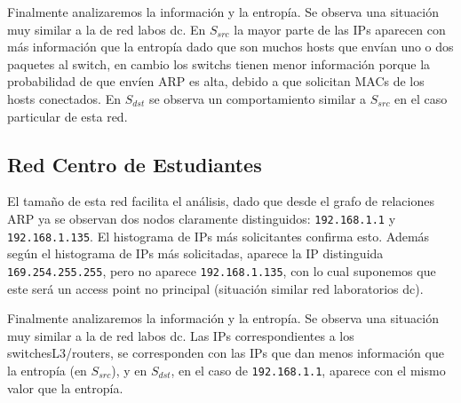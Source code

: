 Finalmente analizaremos la información y la entropía. Se observa una situación muy similar a la de red labos dc. En $S_{src}$ la mayor parte de las IPs
aparecen con más información que la entropía dado que son muchos hosts que envían uno o dos paquetes al switch, en cambio los switchs tienen menor
información porque la probabilidad de que envíen ARP es alta, debido a que solicitan MACs de los hosts conectados. En $S_{dst}$ se observa un
comportamiento similar a $S_{src}$ en el caso particular de esta red.


\subsection{Red Centro de Estudiantes}

El tamaño de esta red facilita el análisis, dado que desde el grafo de relaciones ARP ya se observan dos nodos claramente distinguidos:
{\tt 192.168.1.1} y {\tt 192.168.1.135}. El histograma de IPs más solicitantes confirma esto. 
Además según el histograma de IPs más solicitadas, aparece la IP distinguida {\tt 169.254.255.255}, pero no aparece {\tt 192.168.1.135}, con lo cual
suponemos que este será un access point no principal (situación similar red laboratorios dc).

Finalmente analizaremos la información y la entropía. Se observa una situación muy similar a la de red labos dc. Las IPs correspondientes a los
switchesL3/routers, se corresponden con las IPs que dan menos información que la entropía (en $S_{src}$), y en $S_{dst}$, en el caso de {\tt 192.168.1.1},
aparece con el mismo valor que la entropía.
